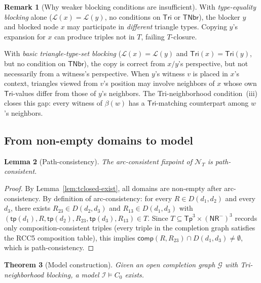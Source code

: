 \documentclass[a4paper,11pt]{article}
\newtheorem{theorem}{Theorem}[section]
\newtheorem{lemma}[theorem]{Lemma}
\theoremstyle{definition}
\newtheorem{remark}[theorem]{Remark}
\newcommand{\comp}{\ensuremath{\mathsf{comp}}}
\newcommand{\tp}{\ensuremath{\mathsf{tp}}}
\newcommand{\Tp}{\ensuremath{\mathsf{Tp}}}
\newcommand{\NR}{\ensuremath{\mathsf{NR}}}
\newcommand{\Tri}{\ensuremath{\mathsf{Tri}}}
\newcommand{\TNbr}{\ensuremath{\mathsf{TNbr}}}
\newcommand{\interp}{\ensuremath{\mathcal{I}}}
\newcommand{\GG}{\ensuremath{\mathcal{G}}}
\newcommand{\LL}{\ensuremath{\mathcal{L}}}
\newcommand{\NN}{\ensuremath{\mathcal{N}}}
\begin{document}
\begin{remark}[Why weaker blocking conditions are insufficient]
\label{rem:type-eq-fail}
With \emph{type-equality blocking} alone ($\LL(x) = \LL(y)$,
no conditions on $\Tri$ or $\TNbr$), the blocker $y$ and
blocked node $x$ may participate in \emph{different} triangle
types.  Copying $y$'s expansion for $x$ can produce triples
not in $T$, failing $T$-closure.

With \emph{basic triangle-type-set blocking} ($\LL(x) = \LL(y)$
and $\Tri(x) = \Tri(y)$, but no condition on $\TNbr$), the
copy is correct from $x/y$'s perspective, but not necessarily
from a witness's perspective.  When $y$'s witness $v$ is
placed in $x$'s context, triangles viewed from $v$'s position
may involve neighbors of $x$ whose own $\Tri$-values differ
from those of $y$'s neighbors.  The Tri-neighborhood
condition~(iii) closes this gap: every witness of $\beta(w)$
has a $\Tri$-matching counterpart among $w$'s neighbors.
\end{remark}

\subsection{From non-empty domains to model}

\begin{lemma}[Path-consistency]\label{lem:ac-preserve}
The arc-consistent fixpoint of $\NN_T$ is path-consistent.
\end{lemma}

\begin{proof}
By Lemma~\ref{lem:tclosed-exist}, all domains are non-empty
after arc-consistency.  By definition of arc-consistency:
for every $R \in D(d_1, d_2)$ and every $d_3$, there exists
$R_{23} \in D(d_2, d_3)$ and $R_{13} \in D(d_1, d_3)$
with $(\tp(d_1), R, \tp(d_2), R_{23}, \tp(d_3), R_{13})
\in T$.  Since $T \subseteq \Tp^3 \times (\NR^{-})^3$ records
only composition-consistent triples (every triple in
the completion graph satisfies the RCC5 composition table),
this implies $\comp(R, R_{23}) \cap D(d_1, d_3) \neq
\emptyset$, which is path-consistency.
\end{proof}

\begin{theorem}[Model construction]\label{thm:model}
Given an open completion graph $\GG$ with Tri-neighborhood
blocking, a model $\interp \models C_0$ exists.
\end{theorem}
\end{document}
